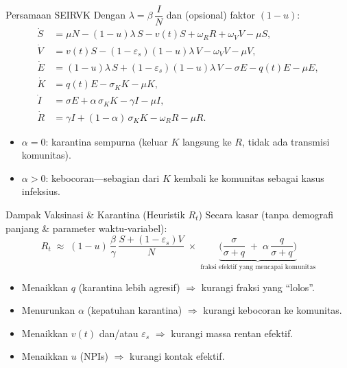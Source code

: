 \documentclass[aspectratio=32]{beamer}
\begin{document}
\begin{frame}{Persamaan SEIRVK}
\small
Dengan $\lambda=\beta\,\dfrac{I}{N}$ dan (opsional) faktor $(1-u)$:
\[
\begin{aligned}
\dot S &= \mu N - (1-u)\lambda\,S - v(t)S + \omega_R R + \omega_V V - \mu S,\\[2pt]
\dot V &= v(t)S - (1-\varepsilon_s)(1-u)\lambda\,V - \omega_V V - \mu V,\\[2pt]
\dot E &= (1-u)\lambda\,S + (1-\varepsilon_s)(1-u)\lambda\,V - \sigma E - q(t)E - \mu E,\\[2pt]
\dot K &= q(t)E - \sigma_K K - \mu K,\\[2pt]
\dot I &= \sigma E + \alpha\,\sigma_K K - \gamma I - \mu I,\\[2pt]
\dot R &= \gamma I + (1-\alpha)\,\sigma_K K - \omega_R R - \mu R.
\end{aligned}
\]
\begin{itemize}
  \item $\alpha=0$: karantina sempurna (keluar $K$ langsung ke $R$, tidak ada transmisi komunitas).
  \item $\alpha>0$: kebocoran—sebagian dari $K$ kembali ke komunitas sebagai kasus infeksius.
\end{itemize}
\end{frame}


\begin{frame}{Dampak Vaksinasi \& Karantina (Heuristik $R_t$)}
\small
Secara kasar (tanpa demografi panjang \& parameter waktu-variabel):
\[
R_t \;\approx\; (1-u)\,\frac{\beta}{\gamma}\,\frac{S + (1-\varepsilon_s)V}{N}
\;\times\; \underbrace{\Bigg(\frac{\sigma}{\sigma+q}\;+\;\alpha\,\frac{q}{\sigma+q}\Bigg)}_{\text{fraksi efektif yang mencapai komunitas}}
\]
\begin{itemize}
  \item Menaikkan $q$ (karantina lebih agresif) $\Rightarrow$ kurangi fraksi yang “lolos”.
  \item Menurunkan $\alpha$ (kepatuhan karantina) $\Rightarrow$ kurangi kebocoran ke komunitas.
  \item Menaikkan $v(t)$ dan/atau $\varepsilon_s$ $\Rightarrow$ kurangi massa rentan efektif.
  \item Menaikkan $u$ (NPIs) $\Rightarrow$ kurangi kontak efektif.
\end{itemize}
\end{frame}

\end{document}
